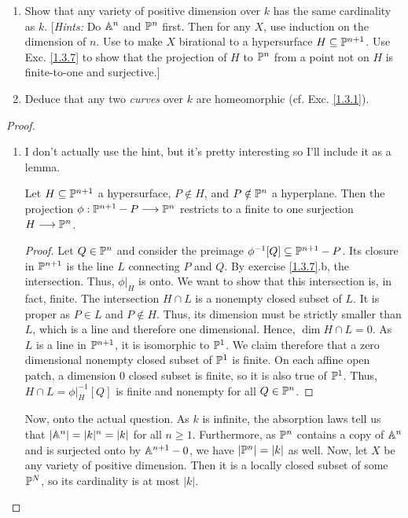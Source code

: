 \label{1.4.8}

\begin{enumerate}[label = (\alph*)]
    \item Show that any variety of positive dimension over $k$ has the same cardinality as $k$. [\emph{Hints:} Do $\A^n$ and $\P^n$ first. Then for any $X$, use induction on the dimension of $n$. Use \cite[I.4.9]{hartshorne} to make $X$ birational to a hypersurface $H \subseteq \P^{n + 1}$. Use Exc. \ref{1.3.7} to show that the projection of $H$ to $\P^n$ from a point not on $H$ is finite-to-one and surjective.]

    \item Deduce that any two \emph{curves} over $k$ are homeomorphic (cf. Exc. \ref{1.3.1}).
\end{enumerate}

\begin{proof}
    \begin{enumerate}[label = (\alph*)]
        \item I don't actually use the hint, but it's pretty interesting so I'll include it as a lemma.
        \begin{lemma}
            Let $H \subseteq \P^{n + 1}$ a hypersurface, $P \notin H$, and $P \notin \P^n$ a hyperplane. Then the projection $\phi: \P^{n + 1} - P \longrightarrow \P^n$ restricts to a finite to one surjection $H \longrightarrow \P^n$.
        \end{lemma}
        \begin{proof}
            Let $Q \in \P^n$ and consider the preimage $\phi^{-1}[Q] \subseteq \P^{n + 1} - P$. Its closure in $\P^{n + 1}$ is the line $L$ connecting $P$ and $Q$. By exercise \ref{1.3.7}.b, the intersection. Thus, $\phi|_H$ is onto. We want to show that this intersection is, in fact, finite. The intersection $H \cap L$ is a nonempty closed subset of $L$. It is proper as $P \in L$ and $P \notin H$. Thus, its dimension must be strictly smaller than $L$, which is a line and therefore one dimensional. Hence, $\dim H \cap L = 0$. As $L$ is a line in $\P^{n + 1}$, it is isomorphic to $\P^1$. We claim therefore that a zero dimensional nonempty closed subset of $\P^1$ is finite. On each affine open patch, a dimension $0$ closed subset is finite, so it is also true of $\P^1$. Thus, $H \cap L = \phi|_{H}^{-1}[Q]$ is finite and nonempty for all $Q \in \P^n$.
        \end{proof}

        Now, onto the actual question. As $k$ is infinite, the absorption laws tell us that $|\A^n| = |k|^n = |k|$ for all $n \geq 1$. Furthermore, as $\P^n$ contains a copy of $\A^n$ and is surjected onto by $\A^{n + 1} - 0$, we have $|\P^n| = |k|$ as well. Now, let $X$ be any variety of positive dimension. Then it is a locally closed subset of some $\P^N$, so its cardinality is at most $|k|$.
        

\end{enumerate}
\end{proof}
